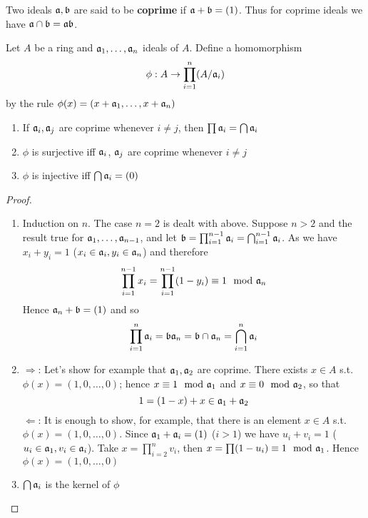 \documentclass[11pt]{article}
\begin{document}
Two ideals \(\mathfrak{a},\mathfrak{b}\) are said to be \textbf{coprime} if \(\mathfrak{a}+\mathfrak{b}=(1)\). Thus for coprime ideals we
have \(\mathfrak{a}\cap\mathfrak{b}=\mathfrak{a}\mathfrak{b}\).

Let \(A\) be a ring and \(\mathfrak{a}_1,\dots,\mathfrak{a}_n\) ideals of \(A\). Define a homomorphism
\begin{equation*}
\phi:A\to\prod_{i=1}^n(A/\mathfrak{a}_i)
\end{equation*}
by the rule \(\phi(x)=(x+\mathfrak{a}_1,\dots,x+\mathfrak{a}_n)\)

\begin{proposition}[]
\begin{enumerate}
\item If \(\mathfrak{a}_i,\mathfrak{a}_j\) are coprime whenever \(i\neq j\), then \(\prod\mathfrak{a}_i=\bigcap\mathfrak{a}_i\)
\item \(\phi\) is surjective iff \(\mathfrak{a}_i\), \(\mathfrak{a}_j\) are coprime whenever \(i\neq j\)
\item \(\phi\) is injective iff \(\bigcap\mathfrak{a}_i=(0)\)
\end{enumerate}
\end{proposition}

\begin{proof}
\begin{enumerate}
\item Induction on \(n\). The case \(n=2\) is dealt with above. Suppose \(n>2\) and the result true
for \(\mathfrak{a}_1,\dots,\mathfrak{a}_{n-1}\), and let \(\mathfrak{b}=\prod_{i=1}^{n-1}\mathfrak{a}_i=\bigcap_{i=1}^{n-1}\mathfrak{a}_i\). As we have \(x_i+y_i=1\)
(\(x_i\in\mathfrak{a}_i,y_i\in\mathfrak{a}_n\)) and therefore
\begin{equation*}
\prod_{i=1}^{n-1}x_i=\prod_{i=1}^{n-1}(1-y_i)\equiv 1\mod {\mathfrak{a}}_n
\end{equation*}
Hence \(\mathfrak{a}_n+\mathfrak{b}=(1)\) and so
\begin{equation*}
\prod_{i=1}^n\mathfrak{a}_i=\mathfrak{b}\mathfrak{a}_n=\mathfrak{b}\cap\mathfrak{a}_n=\bigcap_{i=1}^n\mathfrak{a}_i
\end{equation*}
\item \(\Rightarrow\): Let's show for example that \(\mathfrak{a}_1,\mathfrak{a}_2\) are coprime. There exists \(x\in A\)
s.t. \(\phi(x)=(1,0,\dots,0)\); hence \(x\equiv 1\mod{\mathfrak{a}}_1\) and \(x\equiv 0\mod{\mathfrak{a}}_2\), so that
\begin{equation*}
1=(1-x)+x\in\mathfrak{a}_1+\mathfrak{a}_2
\end{equation*}
\(\Leftarrow\): It is enough to show, for example, that there is an element \(x\in A\)
s.t. \(\phi(x)=(1,0,\dots,0)\). Since \(\mathfrak{a}_1+\mathfrak{a}_i=(1)\) (\(i>1\)) we have \(u_i+v_i=1\) (\(u_i\in\mathfrak{a}_1,v_i\in\mathfrak{a}_i\)).
Take \(x=\prod_{i=2}^nv_i\), then \(x=\prod(1-u_i)\equiv 1\mod{\mathfrak{a}}_1\). Hence \(\phi(x)=(1,0,\dots,0)\)
\item \(\bigcap\mathfrak{a}_i\) is the kernel of \(\phi\)
\end{enumerate}
\end{proof}
\end{document}
